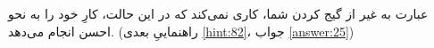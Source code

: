 \section{}
\paragraph{}\label{hint:3}
عبارت  به غیر از گیج کردن شما، کاری نمی‌کند که در این حالت، کارِ خود را به نحو احسن انجام می‌دهد. (راهنماییِ بعدی \ref{hint:82}، جواب \ref{answer:25})